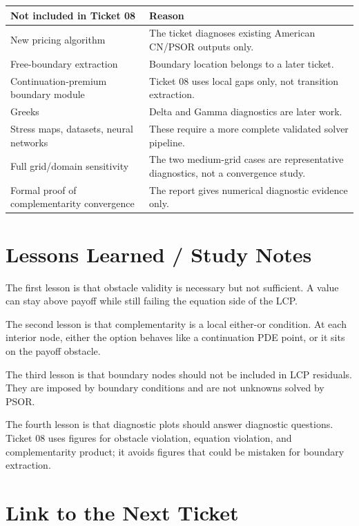 \documentclass[11pt,a4paper]{article}
\begin{document}
\begin{longtable}{L{0.34\textwidth}L{0.54\textwidth}}
\toprule
Not included in Ticket 08 & Reason \\
\midrule
\endhead
New pricing algorithm & The ticket diagnoses existing American CN/PSOR outputs only. \\
Free-boundary extraction & Boundary location belongs to a later ticket. \\
Continuation-premium boundary module & Ticket 08 uses local gaps only, not transition extraction. \\
Greeks & Delta and Gamma diagnostics are later work. \\
Stress maps, datasets, neural networks & These require a more complete validated solver pipeline. \\
Full grid/domain sensitivity & The two medium-grid cases are representative diagnostics, not a
convergence study. \\
Formal proof of complementarity convergence & The report gives numerical diagnostic evidence only. \\
\bottomrule
\end{longtable}

\section{Lessons Learned / Study Notes}

The first lesson is that obstacle validity is necessary but not sufficient. A value can stay
above payoff while still failing the equation side of the LCP.

The second lesson is that complementarity is a local either-or condition. At each interior node,
either the option behaves like a continuation PDE point, or it sits on the payoff obstacle.

The third lesson is that boundary nodes should not be included in LCP residuals. They are imposed
by boundary conditions and are not unknowns solved by PSOR.

The fourth lesson is that diagnostic plots should answer diagnostic questions. Ticket 08 uses
figures for obstacle violation, equation violation, and complementarity product; it avoids
figures that could be mistaken for boundary extraction.

\section{Link to the Next Ticket}
\end{document}
